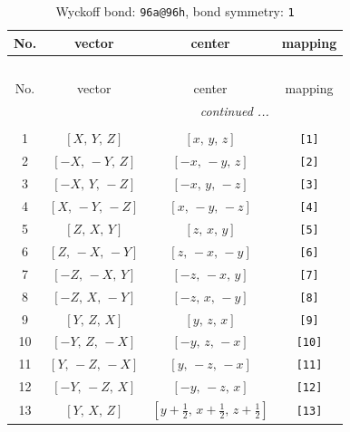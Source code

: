 \documentclass[fleqn,8pt]{jsarticle}
\begin{document}
\begin{longtable}{cccc}
\caption{Wyckoff bond: {\tt 96a@96h}, bond symmetry: {\tt 1}}
 \\
 \hline \hline
No. & vector & center & mapping \\ \hline \endfirsthead

\multicolumn{3}{l}{\tablename\ \thetable{}} \\
 \hline \hline
No. & vector & center & mapping \\ \hline \endhead

 \hline \hline
\multicolumn{3}{r}{\footnotesize\it continued ...} \\ \endfoot

 \hline \hline
\multicolumn{3}{r}{} \\ \endlastfoot

1 & $\left[ X,\, Y,\, Z \right]$ & $\left[ x,\, y,\, z \right]$ & {\tt [1]} \\ \hline
2 & $\left[ - X,\, - Y,\, Z \right]$ & $\left[ - x,\, - y,\, z \right]$ & {\tt [2]} \\ \hline
3 & $\left[ - X,\, Y,\, - Z \right]$ & $\left[ - x,\, y,\, - z \right]$ & {\tt [3]} \\ \hline
4 & $\left[ X,\, - Y,\, - Z \right]$ & $\left[ x,\, - y,\, - z \right]$ & {\tt [4]} \\ \hline
5 & $\left[ Z,\, X,\, Y \right]$ & $\left[ z,\, x,\, y \right]$ & {\tt [5]} \\ \hline
6 & $\left[ Z,\, - X,\, - Y \right]$ & $\left[ z,\, - x,\, - y \right]$ & {\tt [6]} \\ \hline
7 & $\left[ - Z,\, - X,\, Y \right]$ & $\left[ - z,\, - x,\, y \right]$ & {\tt [7]} \\ \hline
8 & $\left[ - Z,\, X,\, - Y \right]$ & $\left[ - z,\, x,\, - y \right]$ & {\tt [8]} \\ \hline
9 & $\left[ Y,\, Z,\, X \right]$ & $\left[ y,\, z,\, x \right]$ & {\tt [9]} \\ \hline
10 & $\left[ - Y,\, Z,\, - X \right]$ & $\left[ - y,\, z,\, - x \right]$ & {\tt [10]} \\ \hline
11 & $\left[ Y,\, - Z,\, - X \right]$ & $\left[ y,\, - z,\, - x \right]$ & {\tt [11]} \\ \hline
12 & $\left[ - Y,\, - Z,\, X \right]$ & $\left[ - y,\, - z,\, x \right]$ & {\tt [12]} \\ \hline
13 & $\left[ Y,\, X,\, Z \right]$ & $\left[ y + \frac{1}{2},\, x + \frac{1}{2},\, z + \frac{1}{2} \right]$ & {\tt [13]} \\ \hline

\end{longtable}
\end{document}
